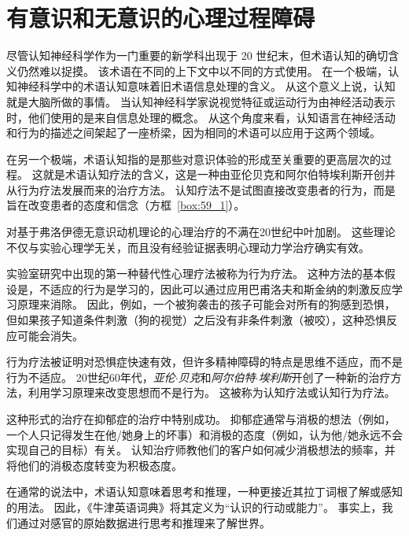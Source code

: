 \chapter{有意识和无意识的心理过程障碍} \label{chap:chap59}

尽管认知神经科学作为一门重要的新学科出现于 20 世纪末，但术语认知的确切含义仍然难以捉摸。
该术语在不同的上下文中以不同的方式使用。
在一个极端，认知神经科学中的术语认知意味着旧术语信息处理的含义。
从这个意义上说，认知就是大脑所做的事情。
当认知神经科学家说视觉特征或运动行为由神经活动表示时，他们使用的是来自信息处理的概念。
从这个角度来看，认知语言在神经活动和行为的描述之间架起了一座桥梁，因为相同的术语可以应用于这两个领域。


在另一个极端，术语认知指的是那些对意识体验的形成至关重要的更高层次的过程。
这就是术语认知疗法的含义，这是一种由亚伦贝克和阿尔伯特埃利斯开创并从行为疗法发展而来的治疗方法。
认知疗法不是试图直接改变患者的行为，而是旨在改变患者的态度和信念（方框~\ref{box:59_1}）。



\begin{proposition}[认知疗法] \label{box:59_1}
	
	\quad \quad 对基于弗洛伊德无意识动机理论的心理治疗的不满在20世纪中叶加剧。
	这些理论不仅与实验心理学无关，而且没有经验证据表明心理动力学治疗确实有效。
	
	\quad \quad 实验室研究中出现的第一种替代性心理疗法被称为行为疗法。
	这种方法的基本假设是，不适应的行为是学习的，因此可以通过应用巴甫洛夫和斯金纳的刺激反应学习原理来消除。
	因此，例如，一个被狗袭击的孩子可能会对所有的狗感到恐惧，但如果孩子知道条件刺激（狗的视觉）之后没有非条件刺激（被咬），这种恐惧反应可能会消失。
	
	\quad \quad 行为疗法被证明对恐惧症快速有效，但许多精神障碍的特点是思维不适应，而不是行为不适应。
	20世纪60年代，\textit{亚伦$\cdot$贝克}和\textit{阿尔伯特$\cdot$埃利斯}开创了一种新的治疗方法，利用学习原理来改变思想而不是行为。
	这被称为认知疗法或认知行为疗法。
	
	\quad \quad 这种形式的治疗在抑郁症的治疗中特别成功。
	抑郁症通常与消极的想法（例如，一个人只记得发生在他/她身上的坏事）和消极的态度（例如，认为他/她永远不会实现自己的目标）有关。
	认知治疗师教他们的客户如何减少消极想法的频率，并将他们的消极态度转变为积极态度。
	
\end{proposition}



在通常的说法中，术语认知意味着思考和推理，一种更接近其拉丁词根了解或感知的用法。
因此，《牛津英语词典》将其定义为“认识的行动或能力”。
事实上，我们通过对感官的原始数据进行思考和推理来了解世界。


